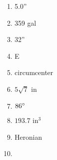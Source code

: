 \documentclass[../uilmath.tex]{subfiles}
\begin{document}
\begin{enumerate}[label=\bfseries\arabic*.]
    \item %
    5.0''

    \item %
    359 gal 

    \item %
    32''

    \item %
    E

    \item %
    circumcenter 

    \item %
    $5\sqrt{7}$ in 

    \item %
    $86\degree$

    \item %
    $193.7$ in$^3$

    \item %
    Heronian 

    \item %
    
\end{enumerate}
\end{document}
